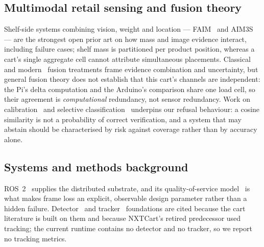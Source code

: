 \documentclass[conference]{IEEEtran}
\begin{document}
\subsection{Multimodal retail sensing and fusion theory}
Shelf-side systems combining vision, weight and location --- FAIM~\cite{R45} and AIM3S~\cite{R46} ---
are the strongest open prior art on how mass and image evidence interact, including failure cases;
shelf mass is partitioned per product position, whereas a cart's single aggregate cell cannot
attribute simultaneous placements. Classical~\cite{R37} and modern~\cite{R53} fusion treatments frame
evidence combination and uncertainty, but general fusion theory does not establish that this cart's
channels are independent: the Pi's delta computation and the Arduino's comparison share one load
cell, so their agreement is \emph{computational} redundancy, not sensor redundancy. Work on
calibration~\cite{R60} and selective classification~\cite{R61} underpins our refusal behaviour: a
cosine similarity is not a probability of correct verification, and a system that may abstain should
be characterised by risk against coverage rather than by accuracy alone.

\subsection{Systems and methods background}
ROS~2~\cite{R54} supplies the distributed substrate, and its quality-of-service model~\cite{R72} is
what makes frame loss an explicit, observable design parameter rather than a hidden failure.
Detector~\cite{R34} and tracker~\cite{R35,R36} foundations are cited because the cart literature is
built on them and because NXTCart's retired predecessor used tracking; the current runtime contains no
detector and no tracker, so we report no tracking metrics.
\end{document}
